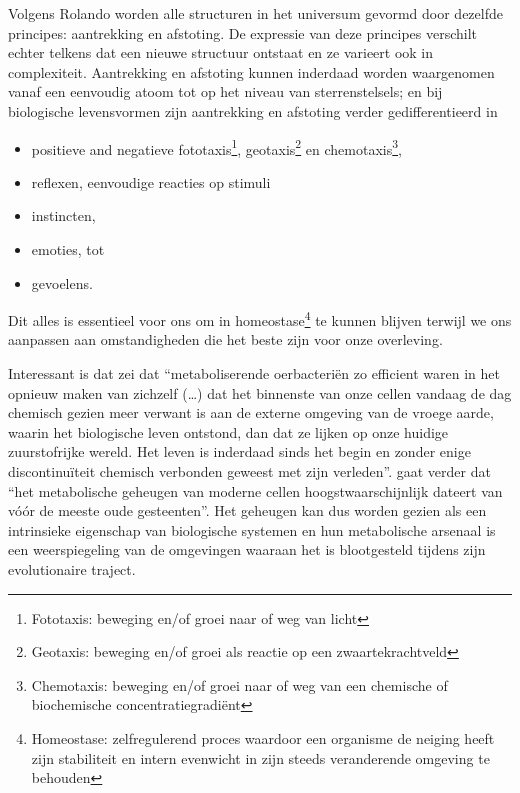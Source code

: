 \documentclass[
  11pt,
]{book}
\providecommand{\tightlist}{%
  \setlength{\itemsep}{0pt}\setlength{\parskip}{0pt}}
\begin{document}
Volgens Rolando worden alle structuren in het universum gevormd door dezelfde principes: aantrekking en afstoting. De expressie van deze principes verschilt echter telkens dat een nieuwe structuur ontstaat en ze varieert ook in complexiteit. Aantrekking en afstoting kunnen inderdaad worden waargenomen vanaf een eenvoudig atoom tot op het niveau van sterrenstelsels; en bij biologische levensvormen zijn aantrekking en afstoting verder gedifferentieerd in

\begin{itemize}
\tightlist
\item
  positieve and negatieve fototaxis\footnote{Fototaxis: beweging en/of groei naar of weg van licht}, geotaxis\footnote{Geotaxis: beweging en/of groei als reactie op een zwaartekrachtveld} en chemotaxis\footnote{Chemotaxis: beweging en/of groei naar of weg van een chemische of biochemische concentratiegradiënt},
\item
  reflexen, eenvoudige reacties op stimuli
\item
  instincten,
\item
  emoties, tot
\item
  gevoelens.
\end{itemize}

Dit alles is essentieel voor ons om in homeostase\footnote{Homeostase: zelfregulerend proces waardoor een organisme de neiging heeft zijn stabiliteit en intern evenwicht in zijn steeds veranderende omgeving te behouden} te kunnen blijven terwijl we ons aanpassen aan omstandigheden die het beste zijn voor onze overleving.

Interessant is dat \citet{margulis1999} zei dat ``metaboliserende oerbacteriën zo efficient waren in het opnieuw maken van zichzelf (\ldots) dat het binnenste van onze cellen vandaag de dag chemisch gezien meer verwant is aan de externe omgeving van de vroege aarde, waarin het biologische leven ontstond, dan dat ze lijken op onze huidige zuurstofrijke wereld. Het leven is inderdaad sinds het begin en zonder enige discontinuïteit chemisch verbonden geweest met zijn verleden''. \citet{margulis1999} gaat verder dat ``het metabolische geheugen van moderne cellen hoogstwaarschijnlijk dateert van vóór de meeste oude gesteenten''. Het geheugen kan dus worden gezien als een intrinsieke eigenschap van biologische systemen en hun metabolische arsenaal is een weerspiegeling van de omgevingen waaraan het is blootgesteld tijdens zijn evolutionaire traject.
\end{document}
